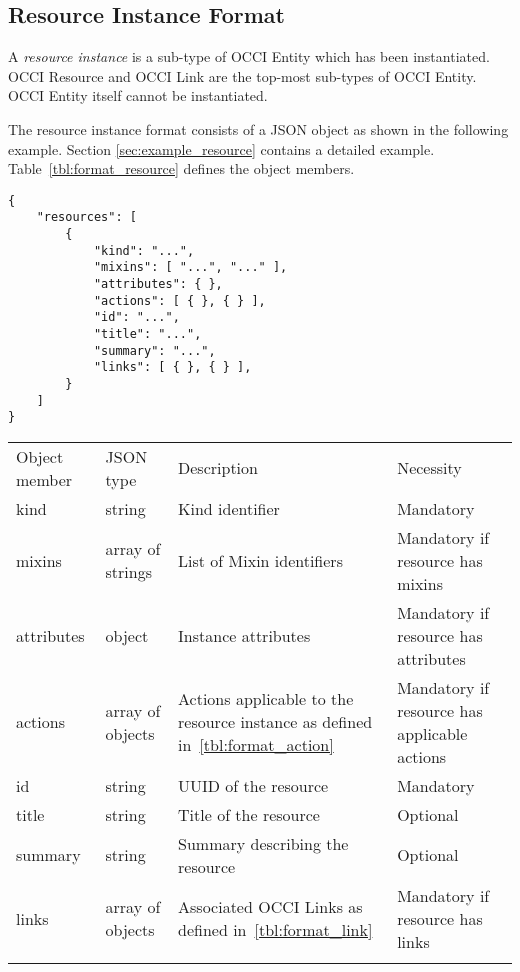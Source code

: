 \documentclass[10pt,a4paper]{article}
\begin{document}

\subsection{Resource Instance Format}
\label{sec:format_resource}

A {\em resource instance} is a sub-type of OCCI Entity which has been instantiated.
OCCI Resource and OCCI Link are the top-most sub-types of OCCI Entity.
OCCI Entity itself cannot be instantiated.

The resource instance format consists of a JSON object as shown in the
following example. Section \ref{sec:example_resource} contains a detailed example.
Table~\ref{tbl:format_resource} defines the object members.
\begin{verbatim}
{
    "resources": [
        {
            "kind": "...",
            "mixins": [ "...", "..." ],
            "attributes": { },
            "actions": [ { }, { } ],
            "id": "...",
            "title": "...",
            "summary": "...",
            "links": [ { }, { } ],
        }
    ]
}
\end{verbatim}
 {
    \begin{tabular}{llp{5.0cm}p{3.0cm}}
    \toprule
    Object member & JSON type & Description & Necessity \\
    \colrule
    kind & string & Kind identifier & Mandatory \\

    mixins & array of strings & List of Mixin identifiers &
    Mandatory if resource has mixins \\

    attributes & object & Instance attributes & Mandatory if resource has attributes \\

    actions & array of objects & Actions applicable to the resource instance as defined in~\ref{tbl:format_action} &
    Mandatory if resource has applicable actions \\
    
    id & string & UUID of the resource & Mandatory\\
        
    title & string & Title of the resource & Optional\\
    
    summary & string & Summary describing the resource & Optional\\
    
    links & array of objects & Associated OCCI Links as defined in~\ref{tbl:format_link} &
    Mandatory if resource has links\\
    \botrule
    \end{tabular}
}
\end{document}
